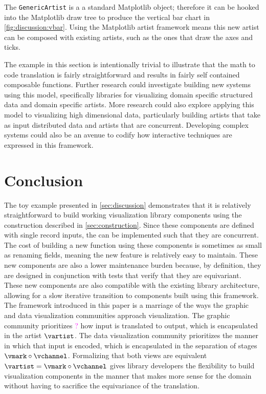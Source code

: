 \documentclass[10pt,journal,compsoc]{IEEEtran}
\newcommand{\note}[1]{\textcolor{magenta}{#1}}
\theoremstyle{definition}
\theoremstyle{remark}
\begin{document}
The \texttt{GenericArtist} is a a standard Matplotlib object; therefore it can be hooked into the Matplotlib draw tree to produce the vertical bar chart in \autoref{fig:discussion:vbar}. Using the Matplotlib artist framework means this new artist can be composed with existing artists, such as the ones that draw the axes and ticks. 



The example in this section is intentionally trivial to illustrate that the math to code translation is fairly straightforward and results in fairly self contained composable functions. Further research could investigate building new systems using this model, specifically libraries for visualizing domain specific structured data and domain specific artists. More research could also explore applying this model to visualizing high dimensional data, particularly building artists that take as input distributed data and artists that are concurrent. Developing complex systems could also be an avenue to codify how interactive techniques are expressed in this framework.


\section{Conclusion}
The toy example presented in \autoref{sec:discussion} demonstrates that it is relatively straightforward to build working visualization library components using the construction described in \autoref{sec:construction}. Since these components are defined with single record inputs, the can be implemented such that they are concurrent. The cost of building a new function using these components is sometimes as small as renaming fields, meaning the new feature is relatively easy to maintain. These new components are also a lower maintenance burden because, by definition, they are designed in conjunction with tests that verify that they are equivariant.  
These new components are also compatible with the existing library architecture, allowing for a slow iterative transition to components built using this framework. 
The framework introduced in this paper is a marriage of the ways the graphic and data visualization communities approach visualization. The graphic community prioritizes \note{?} how input is translated to output, which is encapsulated in the artist $\vartist$. The data visualization community prioritizes the manner in which that input is encoded, which is encapsulated in the separation of stages $\vmark \circ \vchannel$. Formalizing that both views are equivalent $\vartist=\vmark \circ \vchannel$ gives library developers the flexibility to build visualization components in the manner that makes more sense for the domain without having to sacrifice the equivariance of the translation. 
\end{document}

